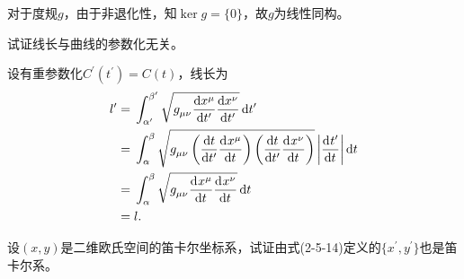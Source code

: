 \begin{xiti}
\begin{zm}
        对于度规$g$，由于非退化性，知$\ker g=\{0\}$，故$g$为线性同构。
    \end{zm}
    
    \item 试证线长与曲线的参数化无关。
    
    \begin{zm}
    	设有重参数化$C^\prime(t^\prime)=C(t)$，线长为
    	\begin{align*}
    	\allowdisplaybreaks
    	l^\prime=&\;\int_{\alpha^\prime}^{\beta^\prime} \sqrt{\tensor{g}{_\mu_\nu} \dv{x^\mu}{t^\prime}\dv{x^\nu}{t^\prime} }\dd{t^\prime}\\
    	=&\;\int_{\alpha}^{\beta} \sqrt{\tensor{g}{_\mu_\nu} \left(\dv{t}{t^\prime}\dvt{x^\mu} \right)\left( \dv{t}{t^\prime}\dvt{x^\nu} \right) }\left| \dvt{t^\prime} \right|\dd{t}\\
    	=&\;\int_{\alpha}^{\beta} \sqrt{\tensor{g}{_\mu_\nu}\dvt{x^\mu}\dvt{x^\nu} }\dd{t}\\
    	=&\;l.
    	\end{align*}
    \end{zm}
    
    \item 设$(x,y)$是二维欧氏空间的笛卡尔坐标系，试证由式(2-5-14)定义的$\{x^\prime,y^\prime \}$也是笛卡尔系。
    

\end{xiti}

